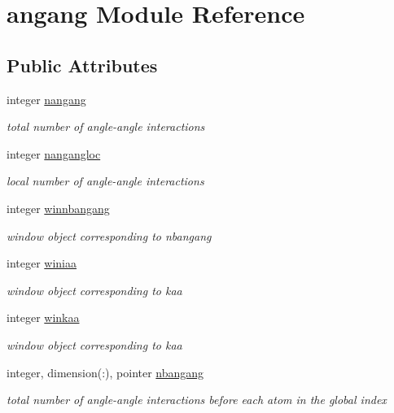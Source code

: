 \hypertarget{classangang}{\section{angang Module Reference}
\label{classangang}
}
\subsection*{Public Attributes}
\begin{DoxyCompactItemize}
\item 
integer \hyperlink{classangang_a27cd11fc29f7185ce70a9a7469b1c6b9}{nangang}
\begin{DoxyCompactList}\small\item\em total number of angle-\/angle interactions \end{DoxyCompactList}\item 
integer \hyperlink{classangang_ad20c3e9280f1a7c396d906a6c22fb67f}{nangangloc}
\begin{DoxyCompactList}\small\item\em local number of angle-\/angle interactions \end{DoxyCompactList}\item 
integer \hyperlink{classangang_aecd4aef495e7c623de821a1e648ec3d1}{winnbangang}
\begin{DoxyCompactList}\small\item\em window object corresponding to nbangang \end{DoxyCompactList}\item 
integer \hyperlink{classangang_a211febc22214b0a0c02c93efc63ac2aa}{winiaa}
\begin{DoxyCompactList}\small\item\em window object corresponding to kaa \end{DoxyCompactList}\item 
integer \hyperlink{classangang_a90e660f9f3271d0ea80c0ef0bd250e09}{winkaa}
\begin{DoxyCompactList}\small\item\em window object corresponding to kaa \end{DoxyCompactList}\item 
integer, dimension(\-:), pointer \hyperlink{classangang_a47beef4aed0dd59a265ad0d99a3609f3}{nbangang}
\begin{DoxyCompactList}\small\item\em total number of angle-\/angle interactions before each atom in the global index \end{DoxyCompactList}\item 

\end{DoxyCompactItemize}
